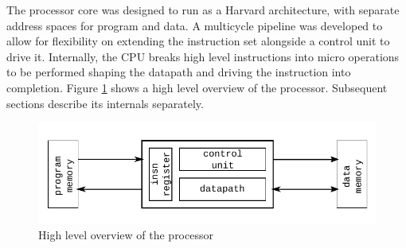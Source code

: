 The processor core was designed to run as a Harvard architecture, with separate
address spaces for program and data. A multicycle pipeline was developed to
allow for flexibility on extending the instruction set alongside a control unit
to drive it. Internally, the CPU breaks high level instructions into micro
operations to be performed shaping the datapath and driving the instruction
into completion. Figure \ref{fig:processor} shows a high level overview of the
processor. Subsequent sections describe its internals separately.
\begin{figure}[h]
	\centering
	\includegraphics{../fig/processor.pdf}
	\caption{High level overview of the processor}
	\label{fig:processor}
\end{figure}
